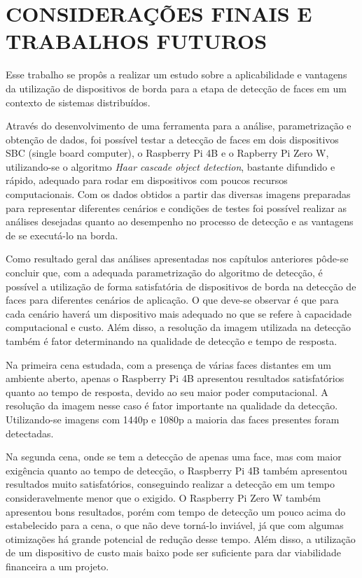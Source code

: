 \chapter{\MakeUppercase{Considerações Finais e Trabalhos Futuros}}
\label{cap:conclusao}
\thispagestyle{plain}

\vspace{-3em} %

Esse trabalho se propôs a realizar um estudo sobre a aplicabilidade e vantagens da utilização de dispositivos de borda para a etapa de detecção de faces em um contexto de sistemas distribuídos.

Através do desenvolvimento de uma ferramenta para a análise, parametrização e obtenção de dados, foi possível testar a detecção de faces em dois dispositivos SBC (single board computer), o Raspberry Pi 4B e o Rapberry Pi Zero W, utilizando-se o algoritmo \textit{Haar cascade object detection}, bastante difundido e rápido, adequado para rodar em dispositivos com poucos recursos computacionais. Com os dados obtidos a partir das diversas imagens preparadas para representar diferentes cenários e condições de testes foi possível realizar as análises desejadas quanto ao desempenho no processo de detecção e as vantagens de se executá-lo na borda.

Como resultado geral das análises apresentadas nos capítulos anteriores pôde-se concluir que, com a adequada parametrização do algoritmo de detecção, é possível a utilização de forma satisfatória de dispositivos de borda na detecção de faces para diferentes cenários de aplicação. O que deve-se observar é que para cada cenário haverá um dispositivo mais adequado no que se refere à capacidade computacional e custo. Além disso, a resolução da imagem utilizada na detecção também é fator determinando na qualidade de detecção e tempo de resposta.

Na primeira cena estudada, com a presença de várias faces distantes em um ambiente aberto, apenas o Raspberry Pi 4B apresentou resultados satisfatórios quanto ao tempo de resposta, devido ao seu maior poder computacional. A resolução da imagem nesse caso é fator importante na qualidade da detecção. Utilizando-se imagens com 1440p e 1080p a maioria das faces presentes foram detectadas.

Na segunda cena, onde se tem a detecção de apenas uma face, mas com maior exigência quanto ao tempo de detecção, o Raspberry Pi 4B também apresentou resultados muito satisfatórios, conseguindo realizar a detecção em um tempo consideravelmente menor que o exigido. O Raspberry Pi Zero W também apresentou bons resultados, porém com tempo de detecção um pouco acima do estabelecido para a cena, o que não deve torná-lo inviável, já que com algumas otimizações há grande potencial de redução desse tempo. Além disso, a utilização de um dispositivo de custo mais baixo pode ser suficiente para dar viabilidade financeira a um projeto.

